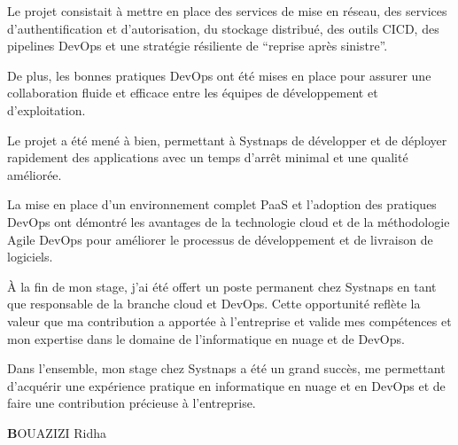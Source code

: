 Le projet consistait à mettre en place des services de mise en réseau, des services d'authentification et d'autorisation, du stockage distribué, des outils CICD, des pipelines DevOps et une stratégie résiliente de “reprise après sinistre”. 

De plus, les bonnes pratiques DevOps ont été mises en place pour assurer une collaboration fluide et efficace entre les équipes de développement et d'exploitation. 

Le projet a été mené à bien, permettant à Systnaps de développer et de déployer rapidement des applications avec un temps d'arrêt minimal et une qualité améliorée. 

La mise en place d'un environnement complet PaaS et l'adoption des pratiques DevOps ont démontré les avantages de la technologie cloud et de la méthodologie Agile DevOps pour améliorer le processus de développement et de livraison de logiciels. 

À la fin de mon stage, j'ai été offert un poste permanent chez Systnaps en tant que responsable de la branche cloud et DevOps. Cette opportunité reflète la valeur que ma contribution a apportée à l'entreprise et valide mes compétences et mon expertise dans le domaine de l'informatique en nuage et de DevOps. 

Dans l'ensemble, mon stage chez Systnaps a été un grand succès, me permettant d'acquérir une expérience pratique en informatique en nuage et en DevOps et de faire une contribution précieuse à l'entreprise.


\begin{flushright}
\textbf BOUAZIZI Ridha
\end{flushright}